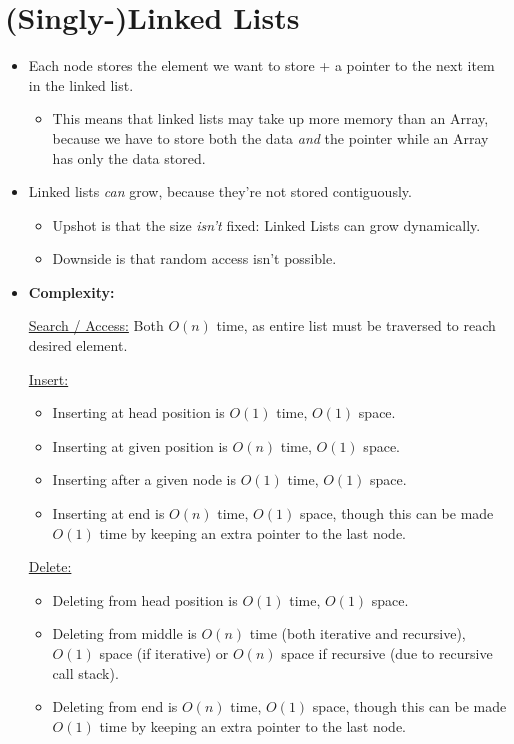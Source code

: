 \documentclass[12pt]{article}
\newcommand{\uln}[1]{{\noindent\ul{#1}}}
\newcommand{\vsp}{\vspace{0.75mm}}
\begin{document}
	\section*{(Singly-)Linked Lists}
	\label{sec:LinkedList}
	\begin{itemize}
	\item Each node stores the element we want to store + a pointer to the next item in the linked list.
	\begin{itemize}
		\item This means that linked lists may take up more memory than an Array, because we have to store both the data \textit{and} the pointer while an Array has only the data stored.
	\end{itemize}
	\item Linked lists \textit{can} grow, because they're not stored contiguously.
	\begin{itemize}
		\item Upshot is that the size \textit{isn't} fixed: Linked Lists can grow dynamically.
		\item Downside is that random access isn't possible.
	\end{itemize}
	\item \textbf{Complexity:}
	
	\vsp
	
	\uln{Search / Access:} Both $O(n)$ time, as entire list must be traversed to reach desired element.\vsp
	
	\uln{Insert:} 
	\begin{itemize}
		\item Inserting at head position is $O(1)$ time, $O(1)$ space.
		\item Inserting at given position is $O(n)$ time, $O(1)$ space.
		\item Inserting after a given node is $O(1)$ time, $O(1)$ space.
		\item Inserting at end is $O(n)$ time, $O(1)$ space, though this can be made $O(1)$ time by keeping an extra pointer to the last node.
	\end{itemize}
	
	\uln{Delete:} 
	\begin{itemize}
		\item Deleting from head position is $O(1)$ time, $O(1)$ space.
		\item Deleting from middle is $O(n)$ time (both iterative and recursive), $O(1)$ space (if iterative) or $O(n)$ space if recursive (due to recursive call stack).
		\item Deleting from end is $O(n)$ time, $O(1)$ space, though this can be made $O(1)$ time by keeping an extra pointer to the last node.
	\end{itemize}
		
	\end{itemize}
\end{document}
